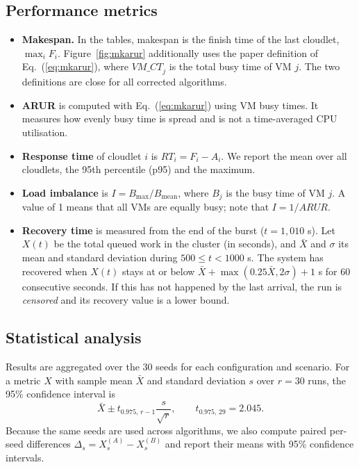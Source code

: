 \documentclass[default,sn-mathphys,Numbered]{sn-jnl}
\begin{document}
\subsection{Performance metrics}\label{sec:metrics}
\begin{itemize}
    \item \textbf{Makespan.} In the tables, makespan is the finish time of the last cloudlet, $\max_i F_i$. Figure~\ref{fig:mkarur} additionally uses the paper definition of Eq.~(\ref{eq:mkarur}), where $\mathit{VM\_CT}_j$ is the total busy time of VM $j$. The two definitions are close for all corrected algorithms.
    \item \textbf{ARUR} is computed with Eq.~(\ref{eq:mkarur}) using VM busy times. It measures how evenly busy time is spread and is not a time-averaged CPU utilisation.
    \item \textbf{Response time} of cloudlet $i$ is $\mathit{RT}_i = F_i - A_i$. We report the mean over all cloudlets, the 95th percentile (p95) and the maximum.
    \item \textbf{Load imbalance} is $I = B_{\max}/B_{\text{mean}}$, where $B_j$ is the busy time of VM $j$. A value of 1 means that all VMs are equally busy; note that $I = 1/\mathit{ARUR}$.
    \item \textbf{Recovery time} is measured from the end of the burst ($t = 1{,}010$ s). Let $X(t)$ be the total queued work in the cluster (in seconds), and $\bar{X}$ and $\sigma$ its mean and standard deviation during $500 \le t < 1000$ s. The system has recovered when $X(t)$ stays at or below $\bar{X} + \max(0.25\bar{X}, 2\sigma) + 1$ s for 60 consecutive seconds. If this has not happened by the last arrival, the run is \emph{censored} and its recovery value is a lower bound.
\end{itemize}

\subsection{Statistical analysis}
Results are aggregated over the 30 seeds for each configuration and scenario. For a metric $X$ with sample mean $\bar{X}$ and standard deviation $s$ over $r = 30$ runs, the 95\% confidence interval is
\begin{equation}\label{eq:ci}
\bar{X} \pm t_{0.975,\,r-1} \frac{s}{\sqrt{r}}, \qquad t_{0.975,\,29} = 2.045 .
\end{equation}
Because the same seeds are used across algorithms, we also compute paired per-seed differences $\Delta_s = X_s^{(A)} - X_s^{(B)}$ and report their means with 95\% confidence intervals.
\end{document}
